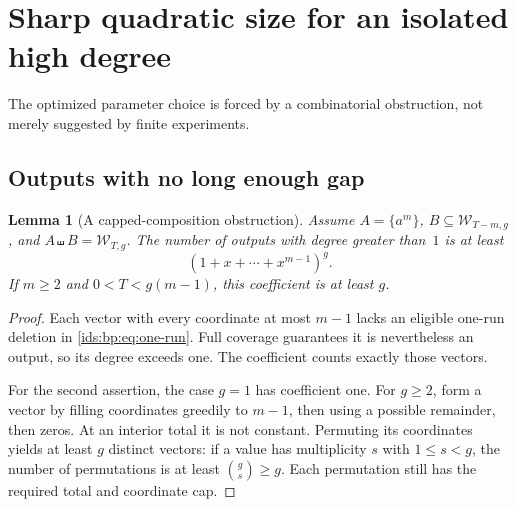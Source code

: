 \documentclass[11pt,letterpaper]{article}
\newtheorem{lemma}[theorem]{Lemma}
\theoremstyle{definition}\newtheorem{definition}[theorem]{Definition}
\theoremstyle{remark}\newtheorem{remark}[theorem]{Remark}
\theoremstyle{definition}\newtheorem{question}[theorem]{Question}
\newcommand{\sh}{\mathbin{\shuffle}}
\newcommand{\bpW}[2]{\mathcal W_{#1,#2}}
\begin{document}
\section{Sharp quadratic size for an isolated high degree}
\label{ids:bp:sec:sharp}

The optimized parameter choice is forced by a combinatorial obstruction,
not merely suggested by finite experiments.

\subsection{Outputs with no long enough gap}
\begin{lemma}[A capped-composition obstruction]
\label{ids:bp:lem:capped}
Assume $A=\{a^m\}$, $B\subseteq\bpW{T-m}{g}$, and
$A\sh B=\bpW{T}{g}$. The number of outputs with degree greater than~$1$
is at least
\begin{equation}
 [x^T](1+x+\cdots+x^{m-1})^g.
 \label{ids:bp:eq:cap-coeff}
\end{equation}
If $m\geq2$ and $0<T<g(m-1)$, this coefficient is at least $g$.
\end{lemma}
\begin{proof}
Each vector with every coordinate at most $m-1$ lacks an eligible one-run
deletion in \eqref{ids:bp:eq:one-run}. Full coverage guarantees it is
nevertheless an output, so its degree exceeds one. The coefficient counts
exactly those vectors.

For the second assertion, the case $g=1$ has coefficient one. For $g\geq2$,
form a vector by filling coordinates greedily to
$m-1$, then using a possible remainder, then zeros. At an interior total it
is not constant. Permuting its coordinates yields at least $g$ distinct
vectors: if a value has multiplicity $s$ with $1\leq s<g$, the number of
permutations is at least $\binom gs\geq g$. Each permutation still has the
required total and coordinate cap.
\end{proof}
\end{document}
